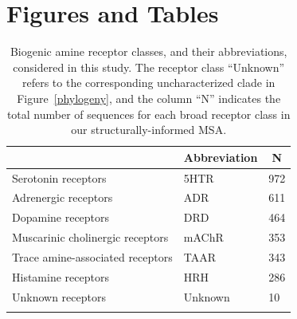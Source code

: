 \documentclass[fleqn,10pt]{wlpeerj}
\begin{document}
\newpage


\section*{Figures and Tables}


\vspace*{5cm}


\begin{table}[htbp]
	\centering
	\begin{tabular}{l l l}
		\hline\noalign{\smallskip}
		\multicolumn{1}{c}{Receptor Class} & \multicolumn{1}{c}{Abbreviation} & \multicolumn{1}{c}{N} \\
		\hline\noalign{\smallskip}
		Serotonin receptors & \quad 5HTR & 972  \\
		Adrenergic receptors & \quad ADR & 611  \\
		Dopamine receptors & \quad DRD & 464 \\
		Muscarinic cholinergic receptors & \quad mAChR & 353  \\
		Trace amine-associated receptors & \quad TAAR & 343 \\
		Histamine receptors & \quad HRH & 286 \\
		Unknown receptors & \quad Unknown & 10 \\
		\noalign{\smallskip}\hline\noalign{\smallskip} 
	\end{tabular}
	\caption{\label{tab:abbrev_count} Biogenic amine receptor classes, and their abbreviations, considered in this study. The receptor class ``Unknown'' refers to the corresponding uncharacterized clade in Figure~\ref{phylogeny}, and the column ``N'' indicates the total number of sequences for each broad receptor class in our structurally-informed MSA.}
\end{table}




\newpage
\end{document}
